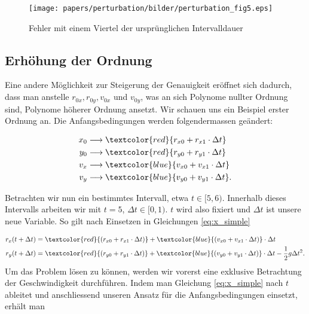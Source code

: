 \begin{figure}
    \centering
    \texttt{[image: papers/perturbation/bilder/perturbation\_fig5.eps]}
    \caption{Fehler mit einem Viertel der ursprünglichen Intervalldauer}
	\label{errorShortInterval2}
\end{figure}

\subsection{Erhöhung der Ordnung}
Eine andere Möglichkeit zur Steigerung der Genauigkeit eröffnet sich dadurch,
dass man anstelle $r_{0x}, r_{0y}, v_{0x}$ und $v_{0y}$,
was an sich Polynome nullter Ordnung sind, Polynome höherer Ordnung ansetzt.
Wir schauen uns ein Beispiel erster Ordnung an.
Die Anfangsbedingungen werden folgendermassen geändert:

\begin{equation}
\label{eq:ordnung1_linear_ansatz}
\begin{aligned}
x_0 &\longrightarrow \textcolor{red}{r_{x0} +  r_{x1}  \cdot \Delta t}\\
y_0 &\longrightarrow \textcolor{red}{r_{y0} +  r_{y1}  \cdot \Delta t}\\
v_x &\longrightarrow \textcolor{blue}{v_{x0} + v_{x1}  \cdot \Delta t}\\
v_y &\longrightarrow \textcolor{blue}{v_{y0} + v_{y1}  \cdot \Delta t}.
\end{aligned}
\end{equation}

Betrachten wir nun ein bestimmtes Intervall, etwa $t \in [5,6)$.
Innerhalb dieses Intervalls arbeiten wir mit $t=5$, $\Delta t \in [0,1)$.
$t$ wird also fixiert und $\Delta t$ ist unsere neue Variable.
So gilt nach Einsetzen in Gleichungen \eqref{eq:x_simple} 

\begin{equation}\label{eq:ordnung1_linear_r}
\begin{aligned}
r_x(t + \Delta t) &= \textcolor{red}{(r_{x0} +   r_{x1} \cdot \Delta t)} + \textcolor{blue}{(v_{x0} + v_{x1}  \cdot \Delta t)} \cdot \Delta t \\
r_y(t + \Delta t) &= \textcolor{red}{(r_{y0} +   r_{y1} \cdot \Delta t)} + \textcolor{blue}{(v_{y0} + v_{y1} \cdot \Delta t)} \cdot \Delta t - \frac{1}{2}g \Delta t^2.
\end{aligned}
\end{equation}
Um das Problem lösen zu können, werden wir vorerst eine exklusive Betrachtung der Geschwindigkeit durchführen.
Indem man Gleichung \eqref{eq:x_simple} nach $t$ ableitet und anschliessend unseren Ansatz für die Anfangsbedingungen einsetzt, erhält man

